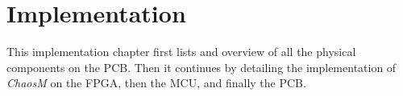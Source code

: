 \chapter{Implementation}\label{chapter:implementation}

This implementation chapter first lists and overview of all the physical
components on the PCB. Then it continues by detailing the implementation of
\textit{ChaosM} on the FPGA, then the MCU, and finally the PCB.

\clearpage

\clearpage

\clearpage

\clearpage

